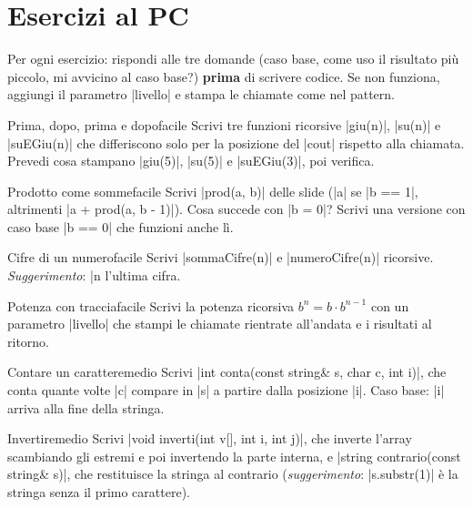 \section{Esercizi al PC}

Per ogni esercizio: rispondi alle tre domande (caso base, come uso il risultato
più piccolo, mi avvicino al caso base?) \textbf{prima} di scrivere codice. Se non
funziona, aggiungi il parametro \cc|livello| e stampa le chiamate come nel pattern.

\begin{esercizio}{Prima, dopo, prima e dopo}{facile}
Scrivi tre funzioni ricorsive \cc|giu(n)|, \cc|su(n)| e \cc|suEGiu(n)| che
differiscono solo per la posizione del \cc|cout| rispetto alla chiamata. Prevedi cosa
stampano \cc|giu(5)|, \cc|su(5)| e \cc|suEGiu(3)|, poi verifica.
\end{esercizio}

\begin{esercizio}{Prodotto come somme}{facile}
Scrivi \cc|prod(a, b)| delle slide (\cc|a| se \cc|b == 1|, altrimenti
\cc|a + prod(a, b - 1)|). Cosa succede con \cc|b = 0|? Scrivi una versione con caso
base \cc|b == 0| che funzioni anche lì.
\end{esercizio}

\begin{esercizio}{Cifre di un numero}{facile}
Scrivi \cc|sommaCifre(n)| e \cc|numeroCifre(n)| ricorsive.
\emph{Suggerimento}: \cc|n %
l'ultima cifra.
\end{esercizio}

\begin{esercizio}{Potenza con traccia}{facile}
Scrivi la potenza ricorsiva $b^n = b \cdot b^{n-1}$ con un parametro \cc|livello| che
stampi le chiamate rientrate all'andata e i risultati al ritorno.
\end{esercizio}

\begin{esercizio}{Contare un carattere}{medio}
Scrivi \cc|int conta(const string& s, char c, int i)|, che conta quante volte \cc|c|
compare in \cc|s| a partire dalla posizione \cc|i|. Caso base: \cc|i| arriva alla
fine della stringa.
\end{esercizio}

\begin{esercizio}{Invertire}{medio}
Scrivi \cc|void inverti(int v[], int i, int j)|, che inverte l'array scambiando gli
estremi e poi invertendo la parte interna, e \cc|string contrario(const string& s)|,
che restituisce la stringa al contrario (\emph{suggerimento}: \cc|s.substr(1)| è la
stringa senza il primo carattere).
\end{esercizio}

